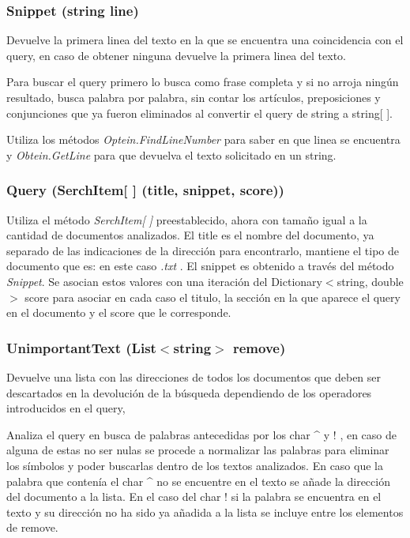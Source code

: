 \documentclass[a4paper,12pt,]{article}
\begin{document}
\subsubsection*{Snippet (string line)}
Devuelve la primera linea del texto en la que se encuentra una coincidencia con el query, en caso de obtener 
ninguna devuelve la primera linea del texto.

Para buscar el query primero lo busca como frase completa y si no arroja ningún resultado, busca palabra por 
palabra, sin contar los artículos, preposiciones y conjunciones que ya fueron eliminados al convertir el query 
de string a string[ ].

Utiliza los métodos \textit{Optein.FindLineNumber} para saber en que linea se encuentra y \textit{Obtein.GetLine} 
para que devuelva el texto solicitado en un string.

\subsubsection*{Query (SerchItem[ ] (title, snippet, score))}
Utiliza el método \textit{SerchItem[ ]} preestablecido, ahora con tamaño igual a la cantidad de documentos analizados. 
El title es el nombre del documento, ya separado de las indicaciones de la dirección para encontrarlo, mantiene el 
tipo de documento que es: en este caso \textit{.txt} . El snippet es obtenido a través del método \textit{Snippet}. 
Se asocian estos valores con una iteración del Dictionary$<$string, double$>$ score para asociar en cada caso el 
titulo, la sección en la que aparece el query en el documento y el score que le corresponde.

\subsubsection*{UnimportantText (List$<$string$>$ remove)}
Devuelve una lista con las direcciones de todos los documentos que deben ser descartados en la devolución de la 
búsqueda dependiendo de los operadores introducidos en el query,

Analiza el query en busca de palabras antecedidas por los char \^{} y ! , en caso de alguna de estas no ser nulas 
se procede a normalizar las palabras para eliminar los símbolos y poder buscarlas dentro de los textos analizados. 
En caso que la palabra que contenía el char \^{} no se encuentre en el texto se añade la dirección del documento a 
la lista. En el caso del char ! si la palabra se encuentra en el texto y su dirección no ha sido ya añadida a la 
lista se incluye entre los elementos de remove.
\end{document}
